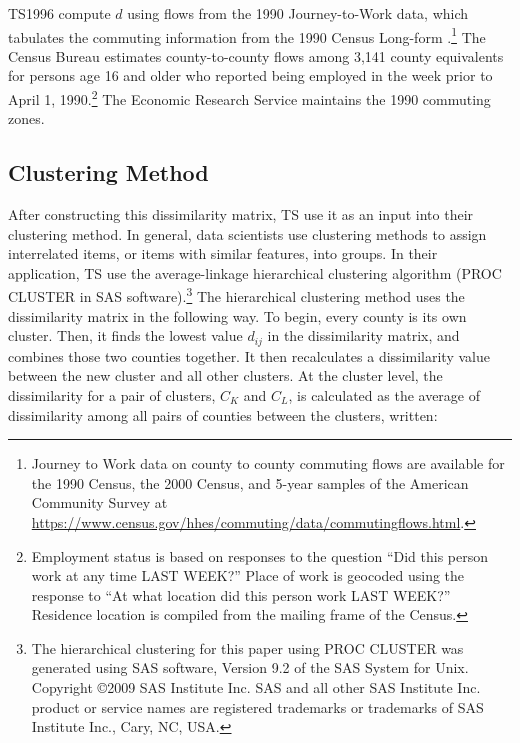 TS1996 compute $d$ using flows from the 1990 Journey-to-Work data, which tabulates the commuting information from the 1990 Census Long-form \citep{Census1990jtw}.\footnote{Journey to Work data on county to county commuting flows are available for the 1990 Census, the 2000 Census, and 5-year samples of the American Community Survey at \url{https://www.census.gov/hhes/commuting/data/commutingflows.html}.} The Census Bureau estimates county-to-county flows among 3,141 county equivalents for persons age 16 and older who reported being employed in the week prior to April 1, 1990.\footnote{Employment status is based on responses to the question ``Did this person work at any time LAST WEEK?'' Place of work is geocoded using the response to ``At what location did this person work LAST WEEK?'' Residence location is compiled from the mailing frame of the Census.} The Economic Research Service maintains the 1990 commuting zones.%

\subsection{Clustering Method}

After constructing this dissimilarity matrix, TS use it as an input into their clustering method. In general, data scientists use clustering methods to assign interrelated items, or items with similar features, into groups. In their application, TS use the average-linkage hierarchical clustering algorithm (PROC CLUSTER in SAS software).\footnote{The hierarchical clustering for this paper using PROC CLUSTER was generated using SAS software, Version 9.2 of the SAS System for Unix. Copyright \copyright 2009 SAS Institute Inc. SAS and all other SAS Institute Inc. product or service names are registered trademarks or trademarks of SAS Institute Inc., Cary, NC, USA.}
The hierarchical clustering method uses the dissimilarity matrix in the following way. To begin, every county is its own cluster. Then, it finds the lowest value $d_{ij}$ in the dissimilarity matrix, and combines those two counties together. It then recalculates a dissimilarity value between the new cluster and all other clusters. At the cluster level, the dissimilarity for a pair of clusters, $C_K$ and $C_L$, is calculated as the average of dissimilarity among all pairs of counties between the clusters, written:

